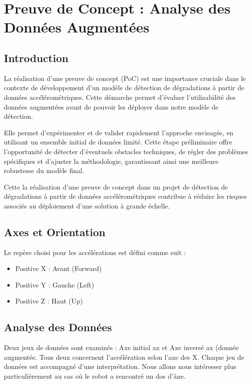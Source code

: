 \newpage
\section{Preuve de Concept : Analyse des Données Augmentées}

\subsection{Introduction}

La réalisation d'une preuve de concept (PoC) \cite{poc} est une importance cruciale dans le contexte de développement d'un modèle de détection de dégradations à partir de données accélérométriques. Cette démarche permet d'évaluer l'utilisabilité des données augmentées avant de pouvoir les déployer dans notre modèle de détection.

Elle permet d'expérimenter et de valider rapidement l'approche envisagée, en utilisant un ensemble initial de données limité. Cette étape préliminaire offre l'opportunité de détecter d'éventuels obstacles techniques, de régler des problèmes spécifiques et d'ajuster la méthodologie, garantissant ainsi une meilleure robustesse du modèle final.

Cette la réalisation d'une preuve de concept dans un projet de détection de dégradations à partir de données accélérométriques contribue à réduire les risques associés au déploiement d'une solution à grande échelle.

\subsection*{Axes et Orientation}

Le repère choisi pour les accélérations est défini comme suit :
\begin{itemize}
    \item Positive X : Avant (Forward)
    \item Positive Y : Gauche (Left)
    \item Positive Z : Haut (Up)
\end{itemize}

\subsection{Analyse des Données}

Deux jeux de données sont examinés : Axe initial ax et Axe inversé ax (donnée augmentée. Tous deux concernent l'accélération selon l'axe des X. Chaque jeu de données est accompagné d'une interprétation. Nous allons nous intéresser plus particulièrement au cas où le robot a rencontré un dos d'âne.

